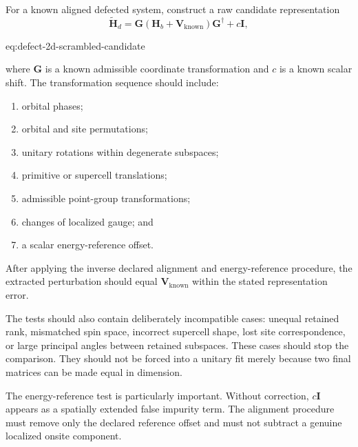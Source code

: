 For a known aligned defected system, construct a raw candidate representation
\begin{equation}
    \widetilde{\mathbf H}_{d}
    =
    \mathbf G
    \left(
        \mathbf H_b+\mathbf V_{\mathrm{known}}
    \right)
    \mathbf G^\dagger
    +
    c\mathbf I,
    \label{eq:defect-2d-scrambled-candidate}
\end{equation}
\begin{equationterms}{eq:defect-2d-scrambled-candidate}
\end{equationterms}
where $\mathbf G$ is a known admissible coordinate transformation and $c$ is a
known scalar shift. The transformation sequence should include:
\begin{enumerate}
    \item orbital phases;
    \item orbital and site permutations;
    \item unitary rotations within degenerate subspaces;
    \item primitive or supercell translations;
    \item admissible point-group transformations;
    \item changes of localized gauge; and
    \item a scalar energy-reference offset.
\end{enumerate}
After applying the inverse declared alignment and energy-reference procedure,
the extracted perturbation should equal $\mathbf V_{\mathrm{known}}$ within the
stated representation error.

The tests should also contain deliberately incompatible cases: unequal retained
rank, mismatched spin space, incorrect supercell shape, lost site
correspondence, or large principal angles between retained subspaces. These
cases should stop the comparison. They should not be forced into a unitary fit
merely because two final matrices can be made equal in dimension.

The energy-reference test is particularly important. Without correction,
$c\mathbf I$ appears as a spatially extended false impurity term. The alignment
procedure must remove only the declared reference offset and must not subtract
a genuine localized onsite component.

